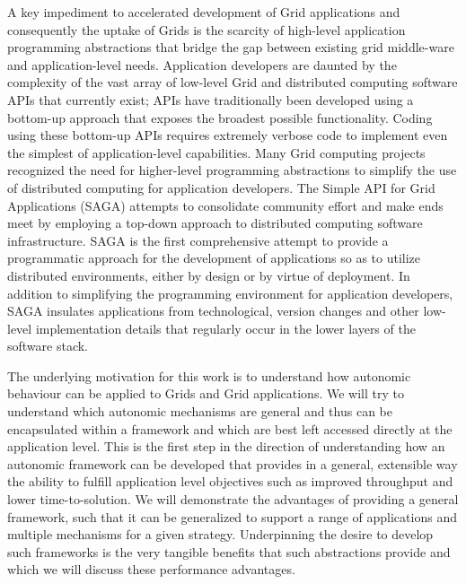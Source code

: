 \documentclass[conference,final]{IEEEtran}
\newcommand{\jhanote}[1]{ {\textcolor{red} { ***Jha: #1 }}}
\newcommand{\yyenote}[1]{ {\textcolor{blue} { ***yye00: #1 }}}
\newcommand{\jhanote}[1]{}
\newcommand{\yyenote}[1]{}
\begin{document}

A key impediment to accelerated development of Grid applications and
consequently the uptake of Grids is the scarcity of high-level
application programming abstractions that bridge the gap between
existing grid middle-ware and application-level needs.  Application
developers are daunted by the complexity of the vast array of
low-level Grid and distributed computing software APIs that currently
exist; APIs have traditionally been developed using a bottom-up
approach that exposes the broadest possible functionality.  Coding
using these bottom-up APIs requires extremely verbose code to
implement even the simplest of application-level capabilities.  Many
Grid computing projects~\cite{gat, cog, realitygrid} recognized the
need for higher-level programming abstractions to simplify the use of
distributed computing for application developers.  The Simple API for
Grid Applications (SAGA) attempts to consolidate community effort and
make ends meet by employing a top-down approach to distributed
computing software infrastructure.  SAGA is the first comprehensive
attempt to provide a programmatic approach for the development of
applications so as to utilize distributed environments, either by
design or by virtue of deployment.  In addition to simplifying the
programming environment for application developers, SAGA insulates
applications from technological, version changes and other low-level
implementation details that regularly occur in the lower layers of the
software stack.

The underlying motivation for this work is to understand how autonomic
behaviour can be applied to Grids and Grid applications. We will try
to understand which autonomic mechanisms are general and thus can be
encapsulated within a framework and which are best left accessed
directly at the application level. This is the first step in the
direction of understanding how an autonomic framework can be developed
that provides in a general, extensible way the ability to fulfill
application level objectives such as improved throughput and lower
time-to-solution. We will demonstrate the advantages of providing a
general framework, such that it can be generalized to support a range
of applications and multiple mechanisms for a given
strategy. Underpinning the desire to develop such frameworks is the
very tangible benefits that such abstractions provide and which we
will discuss these performance advantages.
\end{document}

